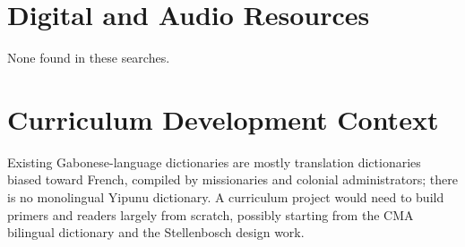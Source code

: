 \documentclass[12pt]{article}
\begin{document}
\section{Digital and Audio Resources}
None found in these searches.

\section{Curriculum Development Context}
Existing Gabonese-language dictionaries are mostly translation dictionaries biased toward French, compiled by missionaries and colonial administrators; there is no monolingual Yipunu dictionary. A curriculum project would need to build primers and readers largely from scratch, possibly starting from the CMA bilingual dictionary and the Stellenbosch design work.
\end{document}
